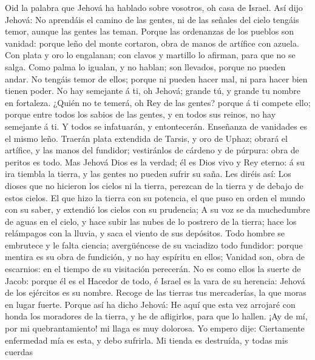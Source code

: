  Oid la palabra que Jehová ha hablado sobre vosotros, oh
casa de Israel.  Así dijo Jehová: No aprendáis el camino de
las gentes, ni de las señales del cielo tengáis temor, aunque las gentes
las teman.  Porque las ordenanzas de los pueblos son
vanidad: porque leño del monte cortaron, obra de manos de artífice con
azuela.  Con plata y oro lo engalanan; con clavos y martillo
lo afirman, para que no se salga.  Como palma lo igualan, y
no hablan; son llevados, porque no pueden andar. No tengáis temor de
ellos; porque ni pueden hacer mal, ni para hacer bien tienen poder.
 No hay semejante á ti, oh Jehová; grande tú, y grande tu
nombre en fortaleza.  ¿Quién no te temerá, oh Rey de las
gentes? porque á ti compete ello; porque entre todos los sabios de las
gentes, y en todos sus reinos, no hay semejante á ti.  Y
todos se infatuarán, y entontecerán. Enseñanza de vanidades es el mismo
leño.  Traerán plata extendida de Tarsis, y oro de Uphaz;
obrará el artífice, y las manos del fundidor; vestiránlos de cárdeno y
de púrpura: obra de peritos es todo.  Mas Jehová Dios es la
verdad; él es Dios vivo y Rey eterno: á su ira tiembla la tierra, y las
gentes no pueden sufrir su saña.  Les diréis así: Los
dioses que no hicieron los cielos ni la tierra, perezcan de la tierra y
de debajo de estos cielos.  El que hizo la tierra con su
potencia, el que puso en orden el mundo con su saber, y extendió los
cielos con su prudencia;  A su voz se da muchedumbre de
aguas en el cielo, y hace subir las nubes de lo postrero de la tierra;
hace los relámpagos con la lluvia, y saca el viento de sus depósitos.
 Todo hombre se embrutece y le falta ciencia; avergüéncese
de su vaciadizo todo fundidor: porque mentira es su obra de fundición, y
no hay espíritu en ellos;  Vanidad son, obra de escarnios:
en el tiempo de su visitación perecerán.  No es como ellos
la suerte de Jacob: porque él es el Hacedor de todo, é Israel es la vara
de su herencia: Jehová de los ejércitos es su nombre. 
Recoge de las tierras tus mercaderías, la que moras en lugar fuerte.
 Porque así ha dicho Jehová: He aquí que esta vez arrojaré
con honda los moradores de la tierra, y he de afligirlos, para que lo
hallen.  ¡Ay de mí, por mi quebrantamiento! mi llaga es muy
dolorosa. Yo empero dije: Ciertamente enfermedad mía es esta, y debo
sufrirla.  Mi tienda es destruída, y todas mis cuerdas
